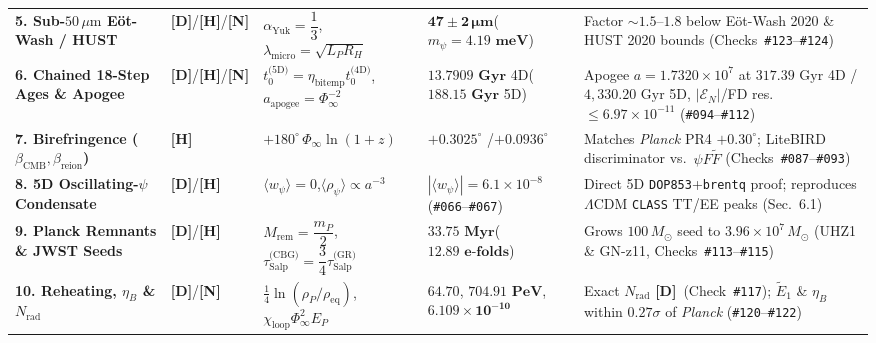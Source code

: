 \documentclass[11pt,a4paper]{article}
\newcommand{\catD}{\textbf{\textcolor{blue!75!black}{[D]}}}
\newcommand{\catH}{\textbf{\textcolor{orange!85!black}{[H]}}}
\newcommand{\catN}{\textbf{\textcolor{teal!75!black}{[N]}}}
\theoremstyle{plain}
\theoremstyle{definition}
\theoremstyle{remark}
\numberwithin{equation}{section}
\begin{document}
\begin{table}[H]
\begin{tabularx}{\textwidth}{@{} L{0.20\textwidth} C{0.11\textwidth} C{0.22\textwidth} C{0.18\textwidth} Y @{}}
\addlinespace[2.5pt]
\textbf{5. Sub-$50\,\mu\text{m}$ E\"ot-Wash / HUST} & \catD/\catH/\catN & $\alpha_{\text{Yuk}} = \dfrac{1}{3}$,\newline$\lambda_{\text{micro}} = \sqrt{L_P R_H}$ & $\mathbf{47 \pm 2\,\mu\text{m}}$\newline($m_{\psi} = \mathbf{4.19\text{ meV}}$) & Factor $\sim 1.5\text{--}1.8$ below E\"ot-Wash 2020 \& HUST 2020 bounds (Checks~\texttt{\#123}--\texttt{\#124}) \cite{lee2020,tan2020_hust} \\
\addlinespace[2.5pt]
\textbf{6. Chained 18-Step Ages \& Apogee} & \catD/\catH/\catN & $t_0^{\text{(5D)}} = \eta_{\text{bitemp}}t_0^{\text{(4D)}}$,\newline$a_{\text{apogee}} = \Phi_{\infty}^{-2}$ & $\mathbf{13.7909\text{ Gyr}}$ 4D\newline($\mathbf{188.15\text{ Gyr}}$ 5D) & Apogee $a=1.7320\times 10^7$ at $317.39\text{ Gyr}$ 4D / $4{,}330.20\text{ Gyr}$ 5D, $|\mathcal{E}_N|$/FD res.\ $\le 6.97\times 10^{-11}$ (\texttt{\#094}--\texttt{\#112}) \\
\addlinespace[2.5pt]
\textbf{7. Birefringence ($\beta_{\text{CMB}}, \beta_{\text{reion}}$)} & \catH & $+180^\circ\,\Phi_{\infty}\ln\left(1 + z\right)$ & $\mathbf{+0.3025^\circ}$ /\newline$\mathbf{+0.0936^\circ}$ & Matches \textit{Planck} PR4 $+0.30^\circ$; LiteBIRD discriminator vs.\ $\psi F\tilde{F}$ (Checks~\texttt{\#087}--\texttt{\#093}) \\
\addlinespace[2.5pt]
\textbf{8. 5D Oscillating-$\psi$ Condensate} & \catD/\catH & $\langle w_{\psi}\rangle = 0$,\newline$\langle\rho_{\psi}\rangle \propto a^{-3}$ & $|\langle w_{\psi}\rangle| = 6.1\times 10^{-8}$\newline(\texttt{\#066}--\texttt{\#067}) & Direct 5D \texttt{DOP853}+\texttt{brentq} proof; reproduces $\Lambda\text{CDM}$ \texttt{CLASS} TT/EE peaks (Sec.~6.1) \\
\addlinespace[2.5pt]
\textbf{9. Planck Remnants \& JWST Seeds} & \catD/\catH & $M_{\text{rem}} = \dfrac{m_P}{2}$,\newline$\tau_{\text{Salp}}^{\text{(CBG)}} = \dfrac{3}{4}\tau_{\text{Salp}}^{\text{(GR)}}$ & $\mathbf{33.75\text{ Myr}}$\newline($\mathbf{12.89\text{ e-folds}}$) & Grows $100\,M_{\odot}$ seed to $3.96\times 10^7\,M_{\odot}$ (UHZ1 \& GN-z11, Checks~\texttt{\#113}--\texttt{\#115}) \\
\addlinespace[2.5pt]
\textbf{10. Reheating, $\eta_B$ \& $N_{\text{rad}}$} & \catD/\catN & $\frac{1}{4}\ln(\rho_P/\rho_{\text{eq}})$,\newline$\chi_{\text{loop}}\Phi_{\infty}^2 E_P$ & $\mathbf{64.70}$, $\mathbf{704.91\text{ PeV}}$,\newline$\mathbf{6.109 \times 10^{-10}}$ & Exact $N_{\text{rad}}$ \catD\ (Check~\texttt{\#117}); $\widetilde{E}_1$ \& $\eta_B$ within $0.27\sigma$ of \textit{Planck} (\texttt{\#120}--\texttt{\#122}) \\

\end{tabularx}
\end{table}
\end{document}
